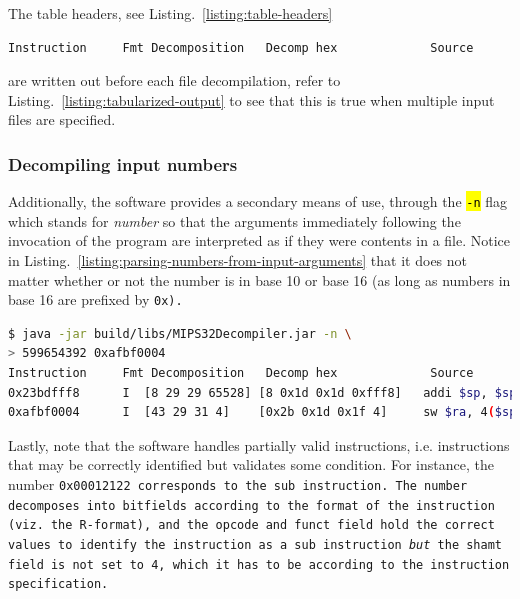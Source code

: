 \documentclass[a4paper]{article}
\newcommand{\hlc}[2][inlinecode]{{\sethlcolor{#1} \texttt{\hl{#2}}}}
\begin{document}
The table headers, see Listing.~\ref{listing:table-headers}

\begin{minipage}{\linewidth}
\begin{lstlisting}[basicstyle=\small, 
    language=bash, 
    caption=Table headers,
    label=listing:table-headers,
    backgroundcolor=\color{mintedbackground}]
Instruction     Fmt Decomposition   Decomp hex             Source
\end{lstlisting}
\end{minipage}

are written out before each file decompilation, refer to
Listing.~\ref{listing:tabularized-output} to see that this is true
when multiple input files are specified.

\subsubsection{Decompiling input numbers}

Additionally, the software provides a secondary means of use, through
the \hlc{-n} flag which stands for \emph{number} so that the arguments
immediately following the invocation of the program are interpreted
as if they were contents in a file. Notice in 
Listing.~\ref{listing:parsing-numbers-from-input-arguments} that it does not matter
whether or not the number is in base 10 or base 16 (as long as numbers in
base 16 are prefixed by \tt{0x}).

\begin{minipage}{\linewidth}
\begin{lstlisting}[basicstyle=\small, 
    language=bash, 
    caption=Parsing numbers from input arguments using the \texttt{-n} flag,
    label=listing:parsing-numbers-from-input-arguments,
  backgroundcolor=\color{mintedbackground}]
$ java -jar build/libs/MIPS32Decompiler.jar -n \
> 599654392 0xafbf0004
Instruction     Fmt Decomposition   Decomp hex             Source            
0x23bdfff8      I  [8 29 29 65528] [8 0x1d 0x1d 0xfff8]   addi $sp, $sp, -8 
0xafbf0004      I  [43 29 31 4]    [0x2b 0x1d 0x1f 4]     sw $ra, 4($sp)    
\end{lstlisting}
\end{minipage}

Lastly, note that the software handles partially valid instructions,
i.e. instructions that may be correctly identified but validates some
condition. For instance, the number \tt{0x00012122} corresponds to the
\tt{sub} instruction. The number decomposes into bitfields according
to the format of the instruction (viz. the R-format), and the opcode
and funct field hold the correct values to identify the instruction as
a \tt{sub} instruction \emph{but} the \tt{shamt} field is not set to
4, which it has to be according to the instruction specification.
\end{document}

